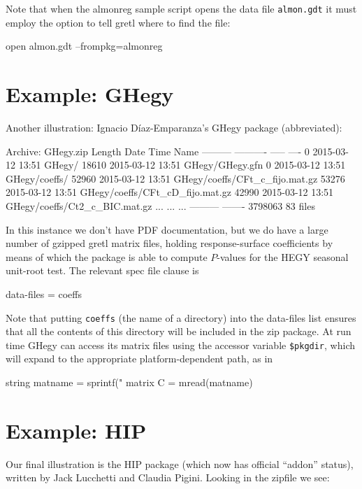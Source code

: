 \documentclass[oneside]{book}
\begin{document}
Note that when the \textsf{almonreg} sample script opens the data file
\texttt{almon.gdt} it must employ the  option to tell
gretl where to find the file:
%
\begin{code}
open almon.gdt --frompkg=almonreg
\end{code}

\section{Example: \textsf{GHegy}}

Another illustration: Ignacio D\'iaz-Emparanza's \textsf{GHegy}
package (abbreviated):
%
\begin{code}
Archive:  GHegy.zip
  Length      Date    Time    Name
---------  ---------- -----   ----
        0  2015-03-12 13:51   GHegy/
    18610  2015-03-12 13:51   GHegy/GHegy.gfn
        0  2015-03-12 13:51   GHegy/coeffs/
    52960  2015-03-12 13:51   GHegy/coeffs/CFt_c_fijo.mat.gz
    53276  2015-03-12 13:51   GHegy/coeffs/CFt_cD_fijo.mat.gz
    42990  2015-03-12 13:51   GHegy/coeffs/Ct2_c_BIC.mat.gz
    ...    ...                ...
---------                     -------
  3798063                     83 files
\end{code}

In this instance we don't have PDF documentation, but we do have a
large number of gzipped gretl matrix files, holding response-surface
coefficients by means of which the package is able to compute
$P$-values for the HEGY seasonal unit-root test. The relevant
spec file clause is
%
\begin{code}
data-files = coeffs
\end{code}
%
Note that putting \texttt{coeffs} (the name of a directory) into the
data-files list ensures that all the contents of this directory will
be included in the zip package. At run time \textsf{GHegy} can access
its matrix files using the accessor variable
\verb|$pkgdir|, which will expand to the appropriate
platform-dependent path, as in
%
\begin{code}
string matname = sprintf("%
matrix C = mread(matname)
\end{code}

\section{Example: \textsf{HIP}}
\label{sec:HIP}

Our final illustration is the \textsf{HIP} package (which now has
official ``addon'' status), written by Jack Lucchetti and Claudia
Pigini. Looking in the zipfile we see:
\end{document}
